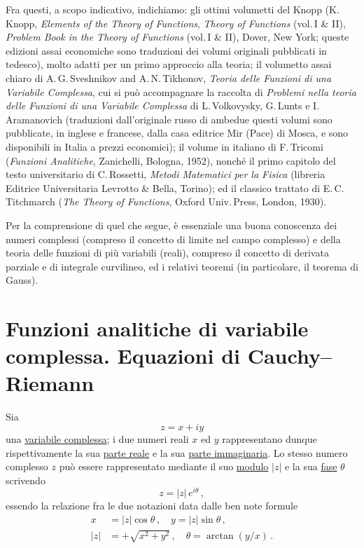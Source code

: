 \documentclass[11pt, a4paper]{book}
\numberwithin{equation}{section}
\begin{document}
Fra questi, a scopo indicativo, indichiamo: gli ottimi volumetti del Knopp (K.\,Knopp, \textit{Elements of the Theory of Functions}, \textit{Theory of Functions} (vol.\,I \& II), \textit{Problem Book in the Theory of Functions} (vol.\,I \& II), Dover, New York; queste edizioni assai economiche sono traduzioni dei volumi originali pubblicati in tedesco), molto adatti per un primo approccio alla teoria; il volumetto assai chiaro di A.\,G.\,Sveshnikov and A.\,N.\,Tikhonov, \textit{Teoria delle Funzioni di una Variabile Complessa}, cui si può accompagnare la raccolta di \textit{Problemi nella teoria delle Funzioni di una Variabile Complessa} di L.\,Volkovysky, G.\,Lunts e I.\,Aramanovich (traduzioni dall'originale russo di ambedue questi volumi sono pubblicate, in inglese e francese, dalla casa editrice Mir (Pace) di Mosca, e sono disponibili in Italia a prezzi economici); il volume in italiano di F.\,Tricomi (\textit{Funzioni Analitiche}, Zanichelli, Bologna, 1952), nonché il primo capitolo del testo universitario di C.\,Rossetti, \textit{Metodi Matematici per la Fisica} (libreria Editrice Universitaria Levrotto \& Bella, Torino); ed il classico trattato di E.\,C.\,Titchmarch (\textit{The Theory of Functions}, Oxford Univ.\,Press, London, 1930).

Per la comprensione di quel che segue, è essenziale una buona conoscenza dei numeri complessi (compreso il concetto di limite nel campo complesso) e della teoria delle funzioni di più variabili (reali), compreso il concetto di derivata parziale e di integrale curvilineo, ed i relativi teoremi (in particolare, il teorema di Gauss).


\section{Funzioni analitiche di variabile complessa. Equazioni di Cauchy--Riemann}

Sia
\begin{equation}
z = x + iy \tag{1a}
\end{equation}
una \underline{variabile complessa}; i due numeri reali $x$ ed $y$ rappresentano dunque rispettivamente la sua \underline{parte reale} e la sua \underline{parte immaginaria}. Lo stesso numero complesso $z$ può essere rappresentato mediante il suo \underline{modulo} $|z|$ e la sua \underline{fase} $\theta$ scrivendo
\begin{equation}
z = |z|\,e^{i\theta}\,, \tag{1b}
\end{equation}
essendo la relazione fra le due notazioni data dalle ben note formule
\begin{align}
x &= |z|\cos\theta\,, \quad y = |z|\sin\theta\,, \tag{2a}\\
|z| &= +\sqrt{x^2+y^2}\,, \quad \theta = \arctan(y/x)\,. \tag{2b}
\end{align}
\end{document}
